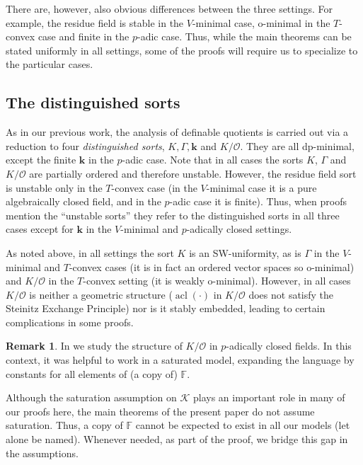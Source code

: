 \documentclass[11pt]{amsart}
\DeclareMathOperator{\acl}{acl}
\theoremstyle{definition}
\newtheorem{remark}[theorem]{Remark}
\newcommand{\bk}{\textbf{k}}
\newcommand{\CK}{{\mathcal K}}
\newcommand{\CO}{{\mathcal O}}
\newcommand{\0}{\emptyset}
\begin{document}
 
 
There are, however,  also obvious differences between the three settings. For example, the residue field is stable in the $V$-minimal case, o-minimal in the $T$-convex case and finite in the $p$-adic case. 
Thus, while the main theorems can be stated uniformly in all settings, some of the  proofs will require us to specialize to the particular cases. 

\subsection{The distinguished sorts}
As in our previous work, the analysis of definable quotients is carried out via a reduction to four {\em distinguished sorts},  $K, \Gamma, \bk$ and $K/\CO$. They are all dp-minimal, except the finite $\bk$ in the $p$-adic case. Note that in all cases the sorts $K$, $\Gamma$ and $K/\CO$ are partially ordered and therefore unstable. However, the residue field sort is unstable only in the $T$-convex case (in the $V$-minimal case it is a pure algebraically closed field, and in the $p$-adic case it is finite). Thus, when proofs mention the  ``unstable sorts'' they refer to the distinguished sorts in all three cases except for $\bk$ in the $V$-minimal and $p$-adically closed settings.

As noted above, in all settings the sort $K$ is an SW-uniformity, as is $\Gamma$ in the $V$-minimal and $T$-convex cases (it is in fact an ordered vector spaces so o-minimal) and $K/\CO$ in the $T$-convex setting (it is weakly o-minimal). However, in all cases $K/\CO$ is neither  a geometric structure ($\acl(\cdot)$ in $K/\CO$ does not satisfy the Steinitz Exchange Principle) nor is it  stably embedded, leading to certain complications in some  proofs. 


\begin{remark}\label{R: assuming named F}
In \cite[\S3]{HaHaPeGps} we study the structure of $K/\CO$ in $p$-adically closed fields. In this context, it was helpful to work in a saturated model, expanding the language by constants for all  elements of (a copy of) $\mathbb{F}$.

Although the saturation assumption on $\CK$ plays an important role in many of our proofs here, the main theorems  of the present paper do not assume saturation. Thus,  a copy of $\mathbb F$ cannot be expected to exist in all our models (let alone be named). Whenever needed, as part of the proof,  we bridge this gap in the assumptions.
\end{remark}
\end{document}
